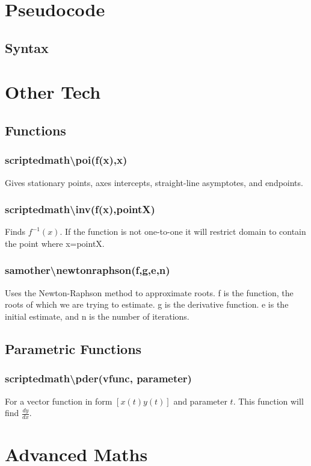 \documentclass[a4paper,twoside]{article}
\begin{document}
	\section{Pseudocode}
		\subsection{Syntax}
		
	\section{Other Tech}
		\subsection{Functions}
			\subsubsection{scriptedmath\textbackslash poi(f(x),x)} Gives stationary points, axes intercepts, straight-line asymptotes, and endpoints.
			\subsubsection{scriptedmath\textbackslash inv(f(x),pointX)} Finds $f^{-1}(x)$. If the function is not one-to-one it will restrict domain to contain the point where x=pointX.
			\subsubsection{sam\textunderscore other\textbackslash newtonraphson(f,g,e,n)} Uses the Newton-Raphson method to approximate roots. f is the function, the roots of which we are trying to estimate. g is the derivative function. e is the initial estimate, and n is the number of iterations.
		\subsection{Parametric Functions}
			\subsubsection{scriptedmath\textbackslash pder(vfunc, parameter)} For a vector function in form $[x(t) y(t)]$ and parameter $t$. This function will find $\frac{dy}{dx}$.
	\section{Advanced Maths}
\end{document}
